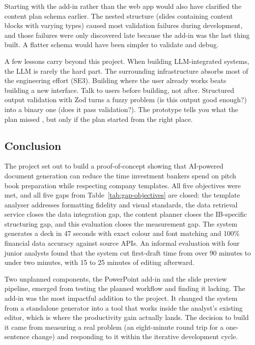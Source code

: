Starting with the add-in rather than the web app would also have clarified the content plan schema earlier. The nested structure (slides containing content blocks with varying types) caused most validation failures during development, and those failures were only discovered late because the add-in was the last thing built. A flatter schema would have been simpler to validate and debug.

A few lessons carry beyond this project. When building LLM-integrated systems, the LLM is rarely the hard part. The surrounding infrastructure absorbs most of the engineering effort (SE3). Building where the user already works beats building a new interface. Talk to users before building, not after. Structured output validation with Zod turns a fuzzy problem (is this output good enough?) into a binary one (does it pass validation?). The prototype tells you what the plan missed \parencite{boehm1988}, but only if the plan started from the right place.

\subsection{Conclusion}

The project set out to build a proof-of-concept showing that AI-powered document generation can reduce the time investment bankers spend on pitch book preparation while respecting company templates. All five objectives were met, and all five gaps from Table~\ref{tab:gap-objectives} are closed: the template analyser addresses formatting fidelity and visual standards, the data retrieval service closes the data integration gap, the content planner closes the IB-specific structuring gap, and this evaluation closes the measurement gap. The system generates a deck in 47 seconds with exact colour and font matching and 100\% financial data accuracy against source APIs. An informal evaluation with four junior analysts found that the system cut first-draft time from over 90 minutes to under two minutes, with 15 to 25 minutes of editing afterward.

Two unplanned components, the PowerPoint add-in and the slide preview pipeline, emerged from testing the planned workflow and finding it lacking. The add-in was the most impactful addition to the project. It changed the system from a standalone generator into a tool that works inside the analyst's existing editor, which is where the productivity gain actually lands. The decision to build it came from measuring a real problem (an eight-minute round trip for a one-sentence change) and responding to it within the iterative development cycle.

